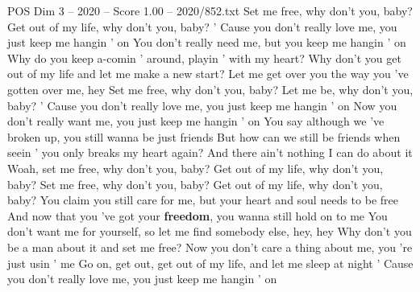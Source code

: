 \begin{textsample}{POS Dim 3 – 2020 – Score 1.00 – 2020/852.txt}  \label{ex:f3_pos_006}
Set me free, why don't you, baby?
Get out of my life, why don't you, baby? ' Cause you don't really love me, you just keep me hangin ' on You don't really need me, but you keep me hangin ' on Why do you keep a-comin ' around, playin ' with my heart?
Why don't you get out of my life and let me make a new start?
Let me get over you the way you 've gotten over me, hey Set me free, why don't you, baby?
Let me be, why don't you, baby? ' Cause you don't really love me, you just keep me hangin ' on Now you don't really want me, you just keep me hangin ' on You say although we 've broken up, you still wanna be just friends But how can we still be friends when seein ' you only breaks my heart again?
And there ain't nothing I can do about it Woah, set me free, why don't you, baby?
Get out of my life, why don't you, baby?
Set me free, why don't you, baby?
Get out of my life, why don't you, baby?
You claim you still care for me, but your heart and soul needs to be free And now that you 've got your \textbf{freedom}, you wanna still hold on to me You don't want me for yourself, so let me find somebody else, hey, hey Why don't you be a man about it and set me free?
Now you don't care a thing about me, you 're just usin ' me Go on, get out, get out of my life, and let me sleep at night ' Cause you don't really love me, you just keep me hangin ' on

\end{textsample}
